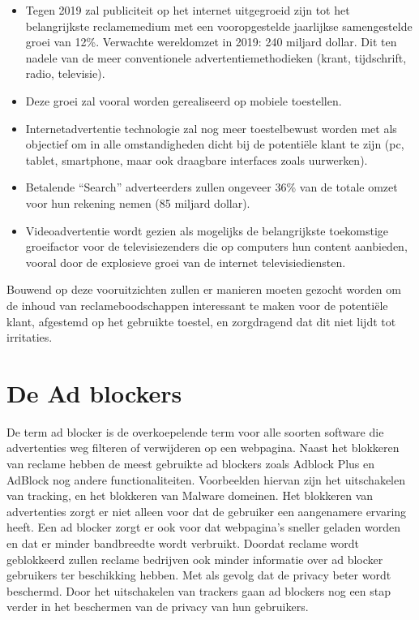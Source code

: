 \documentclass[pdftex,a4paper,12pt,twoside]{report}
\begin{document}
\begin{itemize}
	\item 	Tegen 2019 zal publiciteit op het internet uitgegroeid zijn tot het belangrijkste reclamemedium met een vooropgestelde jaarlijkse samengestelde groei van 	12\%. Verwachte wereldomzet in 2019: 240 miljard dollar. Dit ten nadele van de meer conventionele advertentiemethodieken (krant, tijdschrift, radio, televisie).
	
	\item	Deze groei zal vooral worden gerealiseerd op mobiele toestellen.
	\item	Internetadvertentie technologie zal nog meer toestelbewust worden met als objectief om in alle omstandigheden dicht bij de potentiële klant te zijn (pc, tablet, smartphone, maar ook draagbare interfaces zoals uurwerken).
	\item	Betalende “Search” adverteerders zullen ongeveer 36\% van de totale omzet voor hun rekening nemen (85 miljard dollar).
	\item	Videoadvertentie wordt gezien als mogelijks de belangrijkste toekomstige groeifactor voor de televisiezenders die op computers hun content aanbieden, vooral door de explosieve groei van de internet televisiediensten.
\end{itemize}
Bouwend op deze vooruitzichten zullen er manieren moeten gezocht worden om de inhoud van reclameboodschappen interessant te maken voor de potentiële klant, afgestemd op het gebruikte toestel, en zorgdragend dat dit niet lijdt tot irritaties. 

\chapter{De Ad blockers}
\label{ch:De Ad blockers}
De term ad blocker is de overkoepelende term voor alle soorten software die advertenties weg filteren of verwijderen op een webpagina. Naast het blokkeren van reclame hebben de meest gebruikte ad blockers zoals Adblock Plus en AdBlock nog andere functionaliteiten. Voorbeelden hiervan zijn het uitschakelen van tracking, en het blokkeren van Malware domeinen. Het blokkeren van advertenties zorgt er niet alleen voor dat de gebruiker een aangenamere ervaring heeft. Een ad blocker zorgt er ook voor dat webpagina’s sneller geladen worden en dat er minder bandbreedte wordt verbruikt. Doordat reclame wordt geblokkeerd zullen reclame bedrijven ook minder informatie over ad blocker gebruikers ter beschikking hebben. Met als gevolg dat de privacy beter wordt beschermd. Door het uitschakelen van trackers gaan ad blockers nog een stap verder in het beschermen van de privacy van hun gebruikers.
\end{document}
